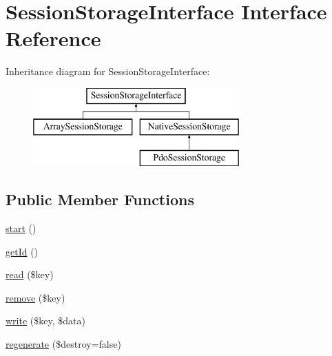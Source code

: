 \hypertarget{interface_symfony_1_1_component_1_1_http_foundation_1_1_session_storage_1_1_session_storage_interface}{
\section{\-Session\-Storage\-Interface \-Interface \-Reference}
\label{interface_symfony_1_1_component_1_1_http_foundation_1_1_session_storage_1_1_session_storage_interface}
}
\-Inheritance diagram for \-Session\-Storage\-Interface\-:\begin{figure}[H]
\begin{center}
\leavevmode
\includegraphics[height=3.000000cm]{interface_symfony_1_1_component_1_1_http_foundation_1_1_session_storage_1_1_session_storage_interface}
\end{center}
\end{figure}
\subsection*{\-Public \-Member \-Functions}
\begin{DoxyCompactItemize}
\item 
\hyperlink{interface_symfony_1_1_component_1_1_http_foundation_1_1_session_storage_1_1_session_storage_interface_af8fa59992209e36dccb3eefb0f75531f}{start} ()
\item 
\hyperlink{interface_symfony_1_1_component_1_1_http_foundation_1_1_session_storage_1_1_session_storage_interface_a12251d0c022e9e21c137a105ff683f13}{get\-Id} ()
\item 
\hyperlink{interface_symfony_1_1_component_1_1_http_foundation_1_1_session_storage_1_1_session_storage_interface_a4c50c958c469c08bba0c0ccb710ca8af}{read} (\$key)
\item 
\hyperlink{interface_symfony_1_1_component_1_1_http_foundation_1_1_session_storage_1_1_session_storage_interface_a95483af4e2c07dc9893fe058b026bd5d}{remove} (\$key)
\item 
\hyperlink{interface_symfony_1_1_component_1_1_http_foundation_1_1_session_storage_1_1_session_storage_interface_a660fb10f6989d97867e2cd7d9107f864}{write} (\$key, \$data)
\item 
\hyperlink{interface_symfony_1_1_component_1_1_http_foundation_1_1_session_storage_1_1_session_storage_interface_a8a41caa79708db4e79d5d453e2cae6b1}{regenerate} (\$destroy=false)
\end{DoxyCompactItemize}


